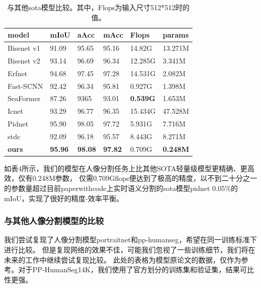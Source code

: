 \documentclass[11pt]{article}
\begin{document}
\begin{table}[!ht]
  \centering
  \begin{tabular}{|l|l|l|l|l|l|}
  \hline
      model & mIoU & aAcc & mAcc & Flops & params \\ \hline
      Bisenet v1 & 91.09 & 95.65 & 95.16 & 14.82G & 13.271M \\ \hline
      Bisenet v2 & 93.14 & 96.69 & 96.34 & 12.285G & 3.341M \\ \hline
      Erfnet & 94.68 & 97.45 & 97.28 & 14.531G & 2.082M \\ \hline
      Fast-SCNN & 92.42 & 96.34 & 95.81 & 0.927G & 1.398M \\ \hline
      SeaFormer & 87.26 & 9365 & 93.01 & \textbf{0.539G} & 1.653M \\ \hline
      Icnet & 93.29 & 96.77 & 96.35 & 15.434G & 47.528M \\ \hline
      Pidnet & 95.90 & 98.05 & 97.72 &  5.931G & 7.716M \\ \hline
      stdc & 92.09 & 96.18 & 95.57 & 8.443G &  8.271M \\ \hline
      \textbf{ours} & \textbf{95.96} & \textbf{98.08} & \textbf{97.82} & 0.709G & \textbf{0.248M} \\ \hline
  \end{tabular}
  \caption{与其他sota模型比较。其中，Flops为输入尺寸512*512时的值。}


\end{table}

如表4所示，我们的模型在人像分割任务上比其他SOTA轻量级模型更精确、更高效，仅有0.248M参数，
仅需0.709Gflops便达到了极高的精度，以不到二十分之一的参数量超过目前paperwithcode上实时语义分割的sota模型pidnet 0.05\%的mIoU，实现了很好的精度-效率平衡。
\subsubsection{与其他人像分割模型的比较}

我们尝试复现了人像分割模型portraitnet和pp-humanseg，希望在同一训练标准下进行比较。
但是复现网络的效果不佳，可能我们忽视了一些训练细节，我们将在未来的工作中继续尝试复现比较。
此处的表格为模型原论文的数据，仅作为参考。对于PP-HumanSeg14K，我们使用了官方划分的训练集和验证集，结果可比性更强。
\end{document}
